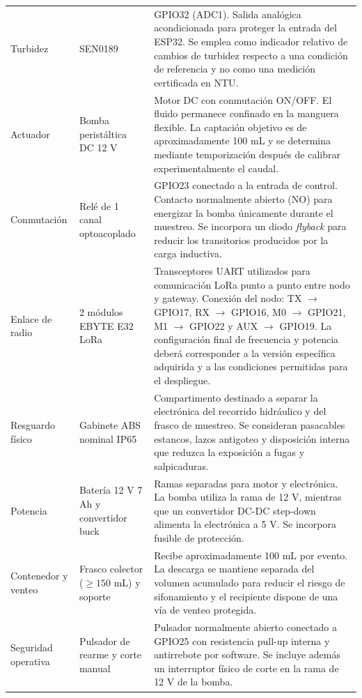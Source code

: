 \documentclass[11pt,a4paper]{article}
\begin{document}
{\begin{longtable}{p{3.2cm}p{4.1cm}p{7.9cm}}
Turbidez &
SEN0189 \cite{turb} &
GPIO32 (ADC1). Salida analógica acondicionada para proteger la entrada del ESP32. Se emplea como indicador relativo de cambios de turbidez respecto a una condición de referencia y no como una medición certificada en NTU. \\

Actuador &
Bomba peristáltica DC 12 V &
Motor DC con conmutación ON/OFF. El fluido permanece confinado en la manguera flexible. La captación objetivo es de aproximadamente 100 mL y se determina mediante temporización después de calibrar experimentalmente el caudal. \\

Conmutación &
Relé de 1 canal optoacoplado &
GPIO23 conectado a la entrada de control. Contacto normalmente abierto (NO) para energizar la bomba únicamente durante el muestreo. Se incorpora un diodo \textit{flyback} para reducir los transitorios producidos por la carga inductiva. \\

Enlace de radio &
2 módulos EBYTE E32 LoRa \cite{ebyteE32} &
Transceptores UART utilizados para comunicación LoRa punto a punto entre nodo y gateway. Conexión del nodo: TX $\to$ GPIO17, RX $\to$ GPIO16, M0 $\to$ GPIO21, M1 $\to$ GPIO22 y AUX $\to$ GPIO19. La configuración final de frecuencia y potencia deberá corresponder a la versión específica adquirida y a las condiciones permitidas para el despliegue. \\

Resguardo físico &
Gabinete ABS nominal IP65 &
Compartimento destinado a separar la electrónica del recorrido hidráulico y del frasco de muestreo. Se consideran pasacables estancos, lazos antigoteo y disposición interna que reduzca la exposición a fugas y salpicaduras. \\

Potencia &
Batería 12 V 7 Ah y convertidor buck &
Ramas separadas para motor y electrónica. La bomba utiliza la rama de 12 V, mientras que un convertidor DC-DC step-down alimenta la electrónica a 5 V. Se incorpora fusible de protección. \\

Contenedor y venteo &
Frasco colector ($\geq150$ mL) y soporte &
Recibe aproximadamente 100 mL por evento. La descarga se mantiene separada del volumen acumulado para reducir el riesgo de sifonamiento y el recipiente dispone de una vía de venteo protegida. \\

Seguridad operativa &
Pulsador de rearme y corte manual &
Pulsador normalmente abierto conectado a GPIO25 con resistencia pull-up interna y antirrebote por software. Se incluye además un interruptor físico de corte en la rama de 12 V de la bomba. \\

\bottomrule
\end{longtable}
}
\end{document}
